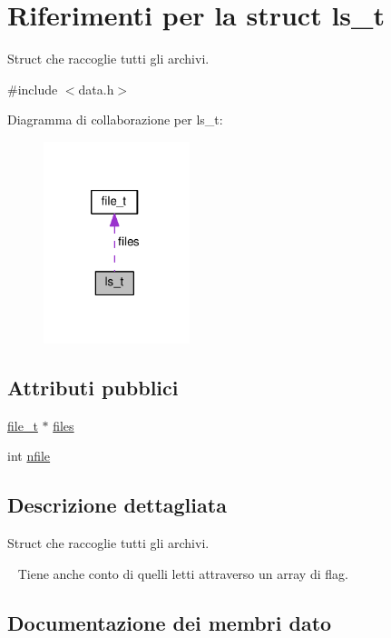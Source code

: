 \hypertarget{structls__t}{}\section{Riferimenti per la struct ls\+\_\+t}
\label{structls__t}


Struct che raccoglie tutti gli archivi.  




{\ttfamily \#include $<$data.\+h$>$}



Diagramma di collaborazione per ls\+\_\+t\+:\nopagebreak
\begin{figure}[H]
\begin{center}
\leavevmode
\includegraphics[width=121pt]{d7/d32/structls__t__coll__graph}
\end{center}
\end{figure}
\subsection*{Attributi pubblici}
\begin{DoxyCompactItemize}
\item 
\hyperlink{structfile__t}{file\+\_\+t} $\ast$ \hyperlink{structls__t_af312bfe211803fb5171b556d1e9ee82a}{files}
\item 
int \hyperlink{structls__t_abb4496e90c61f2a5af018644b8a7441e}{nfile}
\end{DoxyCompactItemize}


\subsection{Descrizione dettagliata}
Struct che raccoglie tutti gli archivi. 

~\newline
Tiene anche conto di quelli letti attraverso un array di flag. 

\subsection{Documentazione dei membri dato}
\mbox{\label{structls__t_af312bfe211803fb5171b556d1e9ee82a}} 
